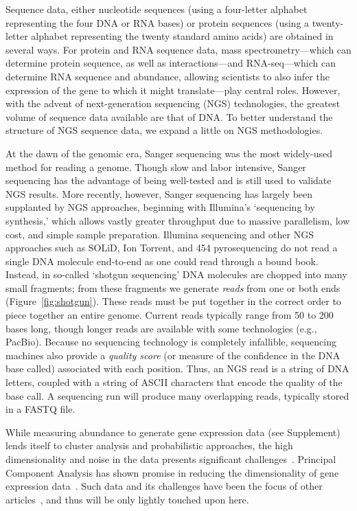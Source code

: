 \documentclass{acm_proc_article-sp}
\begin{document}
Sequence data, either 
nucleotide sequences (using a four-letter alphabet representing the four
DNA or RNA bases) or protein sequences (using a twenty-letter alphabet 
representing the twenty standard amino acids)
are obtained in several ways.
For protein and RNA sequence data, mass spectrometry---which
can determine protein sequence, as well as interactions---and RNA-seq---which can determine RNA sequence and abundance, 
allowing scientists to also infer the expression of the gene to which it might translate---play central roles.
However, with the advent of next-generation sequencing (NGS) technologies, the greatest volume of sequence data available are that of DNA.
To better understand the structure of NGS sequence data, we expand a little on NGS methodologies.

At the dawn of the genomic era, Sanger sequencing was the most widely-used 
method for reading a genome.
Though slow and labor intensive, Sanger sequencing has the advantage of being
well-tested and is still used to validate NGS results.
More recently, however, Sanger sequencing has largely been supplanted by NGS approaches,
beginning with Illumina's `sequencing by synthesis,' which allows vastly 
greater throughput due to massive parallelism, low cost, and simple sample
preparation.
Illumina sequencing and other NGS approaches
such as SOLiD, Ion Torrent, and 454 pyrosequencing do not read a single DNA
molecule end-to-end as one could read through a bound book.
Instead, in so-called `shotgun sequencing' DNA molecules are chopped into many small fragments;
from these fragments we generate 
\emph{reads} from one or both ends (Figure~\ref{fig:shotgun}).
These reads must be put together in the correct order 
to piece together an entire genome.
Current reads typically range from 50 to 200 bases long, though longer reads are
available with some technologies (e.g., PacBio).
Because no sequencing technology is completely infallible, sequencing machines also
provide a \emph{quality score} (or measure of the confidence in the DNA base
called) associated with each position.
Thus, an NGS read is a string of DNA letters, coupled with a string of ASCII
characters that encode the quality of the base call.
A sequencing run will produce many overlapping reads, typically stored in a FASTQ
file.

While measuring abundance to generate gene expression data (see Supplement) lends itself to cluster analysis 
and probabilistic 
approaches, the high dimensionality and noise in the data presents significant 
challenges~\cite{berger2013computational}.
Principal Component Analysis has shown promise in reducing the dimensionality
of gene expression 
data~\cite{berger2013computational}.
Such data and its challenges have been the focus of other 
articles~\cite{berger2013computational}, and thus will be only lightly touched 
upon here.
\end{document}
